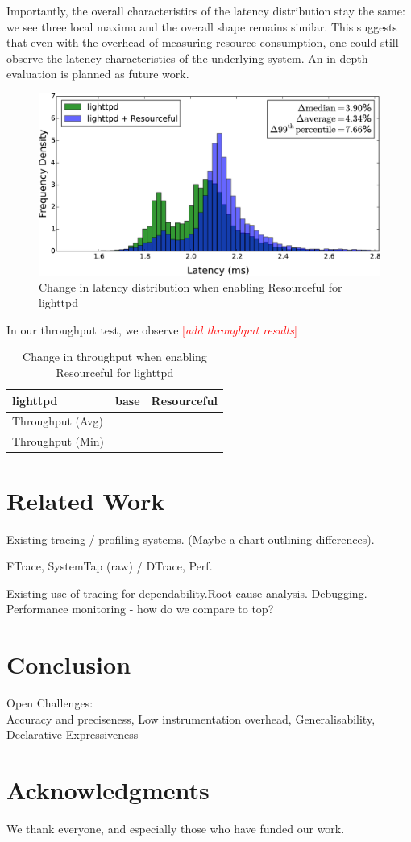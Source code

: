 \documentclass[letterpaper,twocolumn,10pt]{article}
\newcommand{\pname}{Resourceful}
\newcommand{\lnote}[1]{\textcolor{red}{[\textit{#1}]}} %
\begin{document}
Importantly, the overall characteristics of the latency distribution stay the same:
we see three local maxima and the overall shape remains similar. This suggests that even with the overhead
of measuring resource consumption, one could still observe the latency characteristics of the underlying system.
An in-depth evaluation is planned as future work.
\begin{figure}[ht!] 
	\centering 
	\includegraphics[width=\columnwidth]{dist_and_fit2}
	\caption{Change in latency distribution when enabling \pname{ }for lighttpd} 
	\label{fig:experiment1}
\end{figure}

In our throughput test, we observe \lnote{add throughput results}

\begin{table}[ht!]
	\centering 
    \begin{tabular}{|l|l|l|}
    \hline
    lighttpd         & base & \pname \\ \hline
    Throughput (Avg) & ~    & ~           \\
    Throughput (Min) & ~    & ~           \\ \hline
    \end{tabular}
    \caption{Change in throughput when enabling \pname{ } for lighttpd}
    \label{tbl:throughput} 
\end{table}

\section{Related Work} 

Existing tracing / profiling systems. (Maybe a chart
outlining differences).

FTrace, SystemTap (raw) / DTrace, Perf.

Existing use of tracing for dependability.\newline Root-cause analysis.
Debugging. Performance monitoring - how do we compare to top?

\section{Conclusion} Open Challenges:\\ Accuracy and preciseness, Low
instrumentation overhead, Generalisability, Declarative Expressiveness

\section{Acknowledgments}

We thank everyone, and especially those who have funded our work.

{\footnotesize  }
\end{document}
